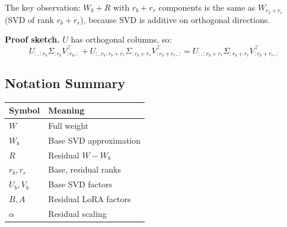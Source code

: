 The key observation: $W_b + R$ with $r_b + r_r$ components is the same as 
$W_{r_b + r_r}$ (SVD of rank $r_b + r_r$), because SVD is additive on 
orthogonal directions.

\textbf{Proof sketch.} $U$ has orthogonal columns, so:
\[
U_{:, :r_b} \Sigma_{:r_b} V_{:r_b, :}^\top + U_{:, r_b:r_b+r_r} \Sigma_{:r_b+r_r} V_{:r_b+r_r, :}^\top = U_{:, :r_b+r_r} \Sigma_{:r_b+r_r} V_{:r_b+r_r, :}^\top
\tag{3.5}
\]

\subsection{Notation Summary}

\begin{table}[H]
\centering
\small
\begin{tabular}{ll}
\toprule
\textbf{Symbol} & \textbf{Meaning} \\
\midrule
$W$ & Full weight \\
$W_b$ & Base SVD approximation \\
$R$ & Residual $W - W_b$ \\
$r_b, r_r$ & Base, residual ranks \\
$U_b, V_b$ & Base SVD factors \\
$B, A$ & Residual LoRA factors \\
$\alpha$ & Residual scaling \\
\bottomrule
\end{tabular}
\end{table}

